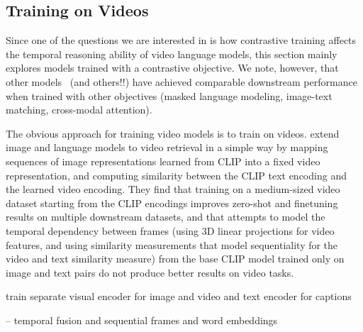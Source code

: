 



\subsection{Training on Videos}
\label{ssec:vidtrain}


Since one of the questions we are interested in is how contrastive training
affects the temporal reasoning ability of video language models, this section
mainly explores models trained with a contrastive objective. We note, however,
that other models~\citep{lei2021clipbert} (and others!!) have achieved
comparable downstream performance when trained with other objectives (masked
language modeling, image-text matching, cross-modal attention).

The obvious approach for training video models is to train on videos.
\citet{luo2022clip4clip} extend image and language models to video retrieval in
a simple way by mapping sequences of image representations learned from CLIP
into a fixed video representation, and computing similarity between the CLIP
text encoding and the learned video encoding. They find that training on a
medium-sized video dataset starting from the CLIP encodings improves zero-shot
and finetuning results on multiple downstream datasets, and that attempts to
model the temporal dependency between frames (using 3D linear projections for
video features, and using similarity measurements that model sequentiality for
the video and text similarity measure) from the base CLIP model trained only on
image and text pairs do not produce better results on video tasks.

\citet{bain2021frozen} train separate visual encoder for image and video and text encoder for captions

\cite{xu2021videoclip}


\citet{lei2021clipbert} -- temporal fusion and sequential frames and word embeddings


